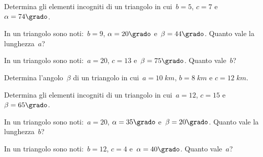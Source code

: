 \begin{multicols}{2}
 \begin{esercizio}
\label{ese:C.68}
Determina gli elementi incogniti di un triangolo in cui~$b=5$, $c=7$ e~$\alpha=74\grado$.
\end{esercizio}

\begin{esercizio}
\label{ese:C.69}
In un triangolo sono noti:~$b=9$, $\alpha=20\grado$ e~$\beta=44\grado$. Quanto vale la lunghezza~$a$?
\end{esercizio}

\begin{esercizio}
\label{ese:C.70}
In un triangolo sono noti:~$a=20$, $c=13$ e~$\beta=75\grado$. Quanto vale~$b$?
\end{esercizio}

\begin{esercizio}
\label{ese:C.71}
Determina l'angolo~$\beta$ di un triangolo in cui~$a=10\;\unit{km}$, $b=8\;\unit{km}$ e $c=12\;\unit{km}$.
\end{esercizio}

\begin{esercizio}
\label{ese:C.72}
Determina gli elementi incogniti di un triangolo in cui~$a=12$, $c=15$ e~$\beta=65\grado$.
\end{esercizio}

\begin{esercizio}
\label{ese:C.73}
In un triangolo sono noti:~$a= 20$, $\alpha=35\grado$ e~$\beta=20\grado$. Quanto vale la lunghezza~$b$?
\end{esercizio}

\begin{esercizio}
\label{ese:C.74}
In un triangolo sono noti:~$b= 12$, $c=4$ e~$\alpha=40\grado$. Quanto vale~$a$?
\end{esercizio}
\end{multicols}

